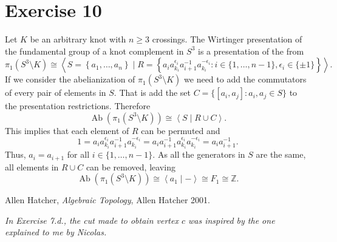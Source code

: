 \documentclass[11pt,a4paper]{article}
\newcommand{\Z}{\mathbb Z}
\begin{document}
\section*{Exercise 10}
Let $ K $ be an arbitrary knot with $n \geq 3$ crossings. The Wirtinger presentation of the fundamental group of a knot complement in $S^3$ is a presentation of the from
$$
  \pi_1(S^3 \setminus K) \cong \left\langle S = \left\{ a_1, \dots, a_n \right\} \mid R = \left\{ a_i a_{k_i}^{\epsilon_i} a_{i+1}^{-1} a_{k_i}^{-\epsilon_i} \colon i \in \{1, \dots, n-1\}, \epsilon_i \in \{\pm 1\}  \right\}\right\rangle.
$$
If we consider the abelianization of $ \pi_1(S^3 \setminus K) $ we need to add the commutators of every pair of elements in $ S $. That is add the set $ C = \{[a_i, a_j] \colon a_i, a_j \in S\}$ to the presentation restrictions. Therefore
$$
  \operatorname{Ab} (\pi_1(S^3 \setminus K)) \cong \left\langle S \mid R \cup C \right\rangle.
$$
This implies that each element of $ R $ can be permuted and
$$
  1 = a_i a_{k_i}^{\epsilon_i} a_{i+1}^{-1} a_{k_i}^{-\epsilon_i} = a_i a_{i+1}^{-1} a_{k_i}^{\epsilon_i} a_{k_i}^{-\epsilon_i} = a_i a_{i+1}^{-1}.
$$
Thus, $ a_i = a_{i+1} $ for all $ i \in \{1, \dots, n-1\} $. As all the generators in $ S $ are the same, all elements in $ R \cup C $ can be removed, leaving
$$
  \operatorname{Ab} (\pi_1(S^3 \setminus K)) \cong \left\langle a_1 \mid - \right\rangle \cong F_1 \cong \Z.
$$

\begin{thebibliography}{9}

  Allen Hatcher,
  \textit{Algebraic Topology},
  Allen Hatcher 2001.

  \textit{In Exercise 7.d., the cut made to obtain vertex $c$ was inspired by the one explained to me by Nicolas.}
  
\end{thebibliography}
\end{document}
